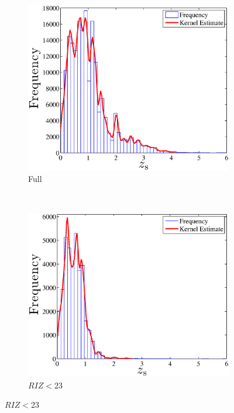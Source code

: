 \documentclass[useAMS,usenatbib,fleqn]{mn2e}
\begin{document}
\begin{figure}
        \centering
        \begin{subfigure}[b]{1\columnwidth}
                 \includegraphics[width=\textwidth]{figures/zspec.eps}
                 \caption{Full}
        \end{subfigure}
        ~
        \begin{subfigure}[b]{1\columnwidth}
                 \includegraphics[width=\textwidth]{figures/zspec_23.eps}
                 \caption{$RIZ<$23}
        \end{subfigure}

\end{figure}
\end{document}

